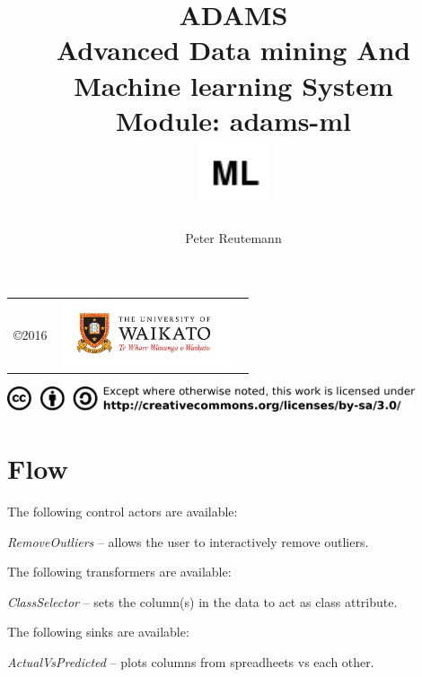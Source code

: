 \documentclass[a4paper]{book}
\title{
  \textbf{ADAMS} \\
  {\Large \textbf{A}dvanced \textbf{D}ata mining \textbf{A}nd \textbf{M}achine
  learning \textbf{S}ystem} \\
  {\Large Module: adams-ml} \\
  \vspace{1cm}
  \includegraphics[width=2cm]{images/ml-module.png} \\
}
\author{
  Peter Reutemann
}
\begin{document}
\begin{titlepage}
\maketitle

\thispagestyle{empty}
\center
\begin{table}[b]
	\begin{tabular}{c l l}
		\parbox[c][2cm]{2cm}{\copyright 2016} &
		\parbox[c][2cm]{5cm}{\includegraphics[width=5cm]{images/coat_of_arms.pdf}}
	\end{tabular}
	\includegraphics[width=12cm]{images/cc.png} \\
\end{table}

\end{titlepage}

\tableofcontents

\chapter{Flow}

The following control actors are available:
\begin{tight_itemize}
  \item \textit{RemoveOutliers} -- allows the user to interactively remove
  outliers.
\end{tight_itemize}

The following transformers are available:
\begin{tight_itemize}
  \item \textit{ClassSelector} -- sets the column(s) in the data to act as
  class attribute.
\end{tight_itemize}

The following sinks are available:
\begin{tight_itemize}
  \item \textit{ActualVsPredicted} -- plots columns from spreadheets vs
  each other.
\end{tight_itemize}



\end{document}
